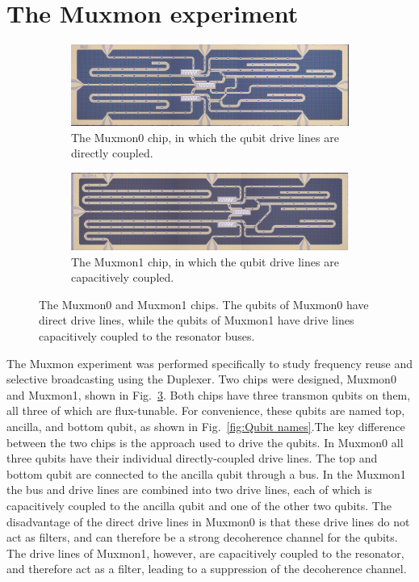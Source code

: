     \section{The Muxmon experiment}
      \label{sec: the Muxmon experiment}
      \begin{figure}[h]
      \centering
        \begin{subfigure}[b]{0.9\textwidth}
          \includegraphics[width=1\linewidth]{Figures/MUX_0.jpg}
          \caption{The Muxmon0 chip, in which the qubit drive lines are directly coupled.}
          \label{fig:Muxmon0 image}
        \end{subfigure}

        \begin{subfigure}[b]{0.9\textwidth}
          \includegraphics[width=1\linewidth]{Figures/MUX_1.jpg}
          \caption{The Muxmon1 chip, in which the qubit drive lines are capacitively coupled.}
          \label{fig:Muxmon1 image}
        \end{subfigure}
        \caption[Muxmon chips]{The Muxmon0 and Muxmon1 chips. The qubits of Muxmon0 have direct drive lines, while the qubits of Muxmon1 have drive lines capacitively coupled to the resonator buses.}
        \label{fig:Muxmon0 and Muxmon1}
      \end{figure}

      The Muxmon experiment was performed specifically to study frequency reuse and selective broadcasting using the Duplexer. Two chips were designed, Muxmon0 and Muxmon1, shown in Fig.~\ref{fig:Muxmon0 and Muxmon1}. Both chips have three transmon qubits on them, all three of which are flux-tunable. For convenience, these qubits are named top, ancilla, and bottom qubit, as shown in Fig.~\ref{fig:Qubit names}.The key difference between the two chips is the approach used to drive the qubits. In Muxmon0 all three qubits have their individual directly-coupled drive lines. The top and bottom qubit are connected to the ancilla qubit through a bus. In the Muxmon1 the bus and drive lines are combined into two drive lines, each of which is capacitively coupled to the ancilla qubit and one of the other two qubits. The disadvantage of the direct drive lines in Muxmon0 is that these drive lines do not act as filters, and can therefore be a strong decoherence channel for the qubits. The drive lines of Muxmon1, however, are capacitively coupled to the resonator, and therefore act as a filter, leading to a suppression of the decoherence channel.

